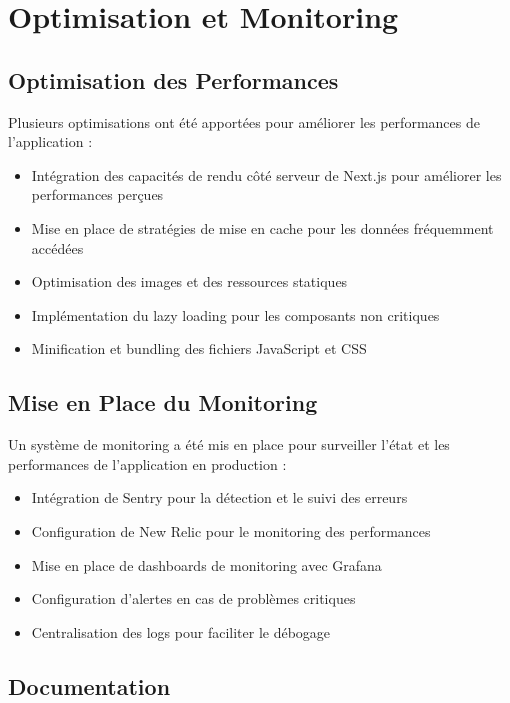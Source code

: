 \section{Optimisation et Monitoring}

\subsection{Optimisation des Performances}

Plusieurs optimisations ont été apportées pour améliorer les performances de l'application :

\begin{itemize}
  \item Intégration des capacités de rendu côté serveur de Next.js pour améliorer les performances perçues
  \item Mise en place de stratégies de mise en cache pour les données fréquemment accédées
  \item Optimisation des images et des ressources statiques
  \item Implémentation du lazy loading pour les composants non critiques
  \item Minification et bundling des fichiers JavaScript et CSS
\end{itemize}

\subsection{Mise en Place du Monitoring}

Un système de monitoring a été mis en place pour surveiller l'état et les performances de l'application en production :

\begin{itemize}
  \item Intégration de Sentry pour la détection et le suivi des erreurs
  \item Configuration de New Relic pour le monitoring des performances
  \item Mise en place de dashboards de monitoring avec Grafana
  \item Configuration d'alertes en cas de problèmes critiques
  \item Centralisation des logs pour faciliter le débogage
\end{itemize}

\subsection{Documentation}

